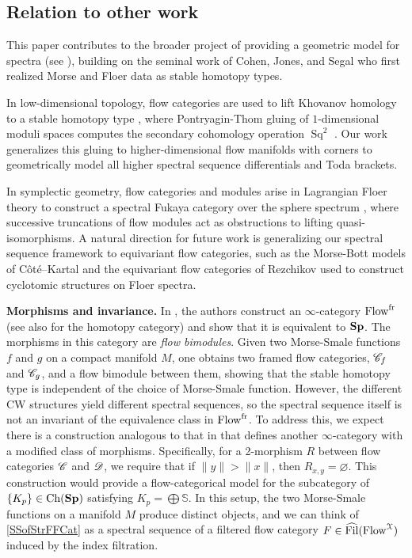 \subsection*{Relation to other work}
This paper contributes to the broader project of providing a geometric model for spectra (see \cite{abouzaid2024foundation}), building on the seminal work of Cohen, Jones, and Segal \cite{CJS95} who first realized Morse and Floer data as stable homotopy types.

In low-dimensional topology, flow categories are used to lift Khovanov homology to a stable homotopy type \cite{LS14}, where Pontryagin-Thom gluing of $1$-dimensional moduli spaces computes the secondary cohomology operation $\operatorname{Sq}^2$ \cite{lipshitz2014steenrod}. Our work generalizes this gluing to higher-dimensional flow manifolds with corners to geometrically model all higher spectral sequence differentials and Toda brackets.

In symplectic geometry, flow categories and modules arise in Lagrangian Floer theory to construct a spectral Fukaya category over the sphere spectrum \cite{porcelli2024bordism}, where successive truncations of flow modules act as obstructions to lifting quasi-isomorphisms. A natural direction for future work is generalizing our spectral sequence framework to equivariant flow categories, such as the Morse-Bott models of C{\^{o}}t{\'{e}}--Kartal \cite{cote2023equivariant} and the equivariant flow categories of Rezchikov \cite{rezchikov2024cyclotomic} used to construct cyclotomic structures on Floer spectra.

\textbf{Morphisms and invariance.} In \cite{abouzaid2024foundation}, the authors construct an $\infty$-category $\mathrm{Flow}^{\operatorname{fr}}$ (see also \cite{porcelli2024bordism} for the homotopy category) and show that it is equivalent to $\mathbf{Sp}$. The morphisms in this category are \emph{flow bimodules}. Given two Morse-Smale functions $f$ and $g$ on a compact manifold $M$, one obtains two framed flow categories, $\mathscr{C}_f$ and $\mathscr{C}_g$, and a flow bimodule between them, showing that the stable homotopy type is independent of the choice of Morse-Smale function. However, the different CW structures yield different spectral sequences, so the spectral sequence itself is not an invariant of the equivalence class in $\mathrm{Flow}^{\operatorname{fr}}$. To address this, we expect there is a construction analogous to that in \cite{abouzaid2024foundation} that defines another $\infty$-category with a modified class of morphisms. Specifically, for a 2-morphism $R$ between flow categories $\mathscr{C}$ and $\mathscr{D}$, we require that if $\|y\| > \|x\|$, then $R_{x,y} = \varnothing$. This construction would provide a flow-categorical model for the subcategory of $\{K_p\} \in \operatorname{Ch}(\mathbf{Sp})$ satisfying $K_p = \bigoplus \mathbb{S}$. In this setup, the two Morse-Smale functions on a manifold $M$ produce distinct objects, and we can think of \cref{SSofStrFFCat} as a spectral sequence of a filtered flow category $F \in \operatorname{\widehat{Fil}}(\mathrm{Flow}^{\EuScript{X}})$ induced by the index filtration.

